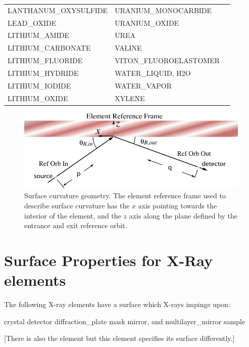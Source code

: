 \begin{center}
\begin{longtable}{lll}
LANTHANUM_OXYSULFIDE                & URANIUM_MONOCARBIDE                       \\
LEAD_OXIDE                          & URANIUM_OXIDE                             \\
LITHIUM_AMIDE                       & UREA                                      \\
LITHIUM_CARBONATE                   & VALINE                                    \\
LITHIUM_FLUORIDE                    & VITON_FLUOROELASTOMER                     \\
LITHIUM_HYDRIDE                     & WATER_LIQUID, H2O                         \\
LITHIUM_IODIDE                      & WATER_VAPOR                               \\
LITHIUM_OXIDE                       & XYLENE                                    \\
\end{longtable}
\end{center}


\begin{figure}[tb]
  \centering
  \includegraphics[width=5in]{surface-curvature.pdf}
  \caption[Surface curvature geometry.]
{Surface curvature geometry. The element reference frame used to
describe surface curvature has the $x$ axis pointing towards the
interior of the element, and the $z$ axis along the plane defined by
the entrance and exit reference orbit.}
  \label{f:surface}
\end{figure}

\section{Surface Properties for X-Ray elements}
\label{s:s.curve}

The following X-ray elements have a surface which X-rays impinge upon:
\begin{example}
  crystal               
  detector              
  diffraction_plate     
  mask                  
  mirror, and           
  multilayer_mirror     
  sample                
\end{example}
[There is also the  element but this element specifies
its surface differently.]

